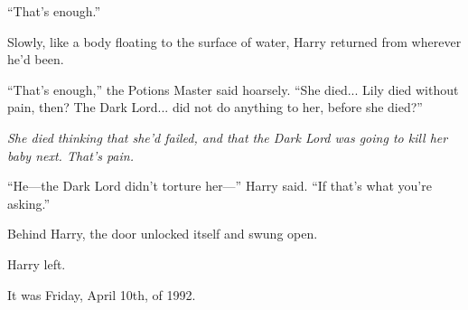 “That’s enough.”

Slowly, like a body floating to the surface of water, Harry returned from wherever he’d been.

“That’s enough,” the Potions Master said hoarsely. “She died... Lily died without pain, then? The Dark Lord... did not do anything to her, before she died?”

\emph{She died thinking that she’d failed, and that the Dark Lord was going to kill her baby next. That’s pain.}

“He—the Dark Lord didn’t torture her—” Harry said. “If that’s what you’re asking.”

Behind Harry, the door unlocked itself and swung open.

Harry left.

It was Friday, April 10th, of 1992.

